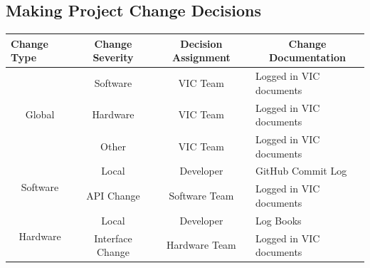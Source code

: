 \documentclass [12pt]{article}
\begin{document}
\subsection{Making Project Change Decisions} 
\begin{longtable}{| p{ } | p{ } | p{ } | p{ } |}

\hline
\centering \textbf{Change Type} & 
\multicolumn{1}{c|}{\textbf {Change Severity}} &
\multicolumn{1}{c}{\textbf {Decision Assignment}} & 
\multicolumn{1}{|c|}{\textbf {Change Documentation}}  \\ \hline

\multicolumn{1}{|c|}{\multirow{3}{*}{Global}} & 
\multicolumn{1}{c}{Software} &
\multicolumn{1}{|c|}{VIC Team} &
Logged in VIC documents	\\\cline{2-4}

 & \multicolumn{1}{c}{Hardware} & 
 \multicolumn{1}{|c|}{VIC Team} &
Logged in VIC documents\\ \cline{2-4}
  
   & \multicolumn{1}{c}{Other} & 
 \multicolumn{1}{|c|}{VIC Team} &
Logged in VIC documents\\ \hline
 
 
\multicolumn{1}{|c|}{\multirow{2}{*}{Software}} & 
\multicolumn{1}{c}{Local} &
\multicolumn{1}{|c|}{Developer}&
GitHub Commit Log \\\cline{2-4}
 
 & 
\multicolumn{1}{c}{API Change} &
\multicolumn{1}{|c|}{Software Team}&
Logged in VIC documents \\ \hline


\multicolumn{1}{|c|}{\multirow{2}{*}{Hardware}} & 
\multicolumn{1}{c}{Local} &
\multicolumn{1}{|c|}{Developer}&
Log Books \\\cline{2-4}
 
 & 
\multicolumn{1}{c}{Interface Change} &
\multicolumn{1}{|c|}{Hardware Team}&
Logged in VIC documents \\ \hline


\end{longtable}

\end{document}
